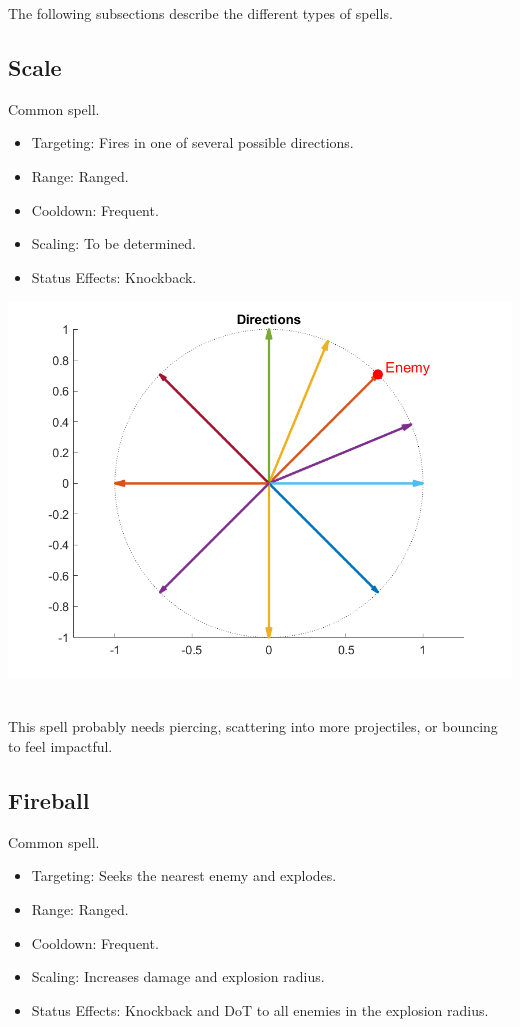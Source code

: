 \documentclass[12pt]{article}
\begin{document}
\noindent
The following subsections describe the different types of spells.

\subsection{Scale}
\begin{minipage}{0.55\textwidth}
Common spell.  
\begin{itemize}    
    \item Targeting: Fires in one of several possible directions.
    \item Range: Ranged. 
    \item Cooldown: Frequent.
    \item Scaling: To be determined.
    \item Status Effects: Knockback.
\end{itemize}
\end{minipage}%
\hfill
\begin{minipage}{0.4\textwidth}
\includegraphics[width=\linewidth]{./assets/directions.png}
\end{minipage}
\vspace{0.5cm}
\\This spell probably needs piercing, scattering into more projectiles, or bouncing to feel impactful. 

\subsection{Fireball}
Common spell.  
\begin{itemize}    
    \item Targeting: Seeks the nearest enemy and explodes.
    \item Range: Ranged. 
    \item Cooldown: Frequent.
    \item Scaling: Increases damage and explosion radius. 
    \item Status Effects: Knockback and DoT to all enemies in the explosion radius.
\end{itemize}
\end{document}
